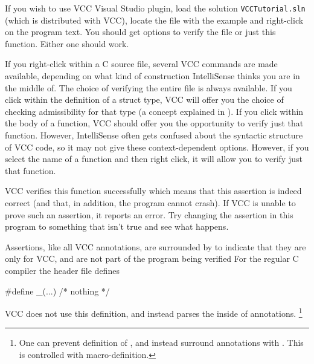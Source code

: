 If you wish to use VCC Visual Studio plugin, load the solution \lstinline|VCCTutorial.sln|
(which is distributed with VCC),
locate the file with the example and right-click on the program text.
You should get options to verify the file or just this function.
Either one should work.

\begin{note}
If you right-click within a C source file,
several VCC commands are made available, depending on what kind of
construction IntelliSense thinks you are in the middle of. The choice
of verifying the entire file is always available. If you click within
the definition of a struct type, VCC will offer you the choice of
checking admissibility for that type (a concept explained in ).
If you click within the body of a function, VCC should offer
you the opportunity to verify just that function. However,
IntelliSense often gets confused about the syntactic structure of
VCC code, so it may not give these context-dependent
options. However, if you select the name of a function and then right
click, it will allow you to verify just that function.
\end{note}

VCC verifies this function successfully which means that this assertion
is indeed correct (and that, in addition, the program cannot
crash). If VCC is unable to prove such an assertion, it reports an
error. Try changing the assertion in this program to something that
isn't true and see what happens.

Assertions, like all VCC annotations, 
are surrounded by  to indicate that they are
only for VCC, and are not part of the program being verified
For the regular C compiler the  header file defines
\begin{VCC}
#define _(...) /* nothing */
\end{VCC}
VCC does not use this definition, and instead parses the inside of 
annotations.%
\footnote{
  One can prevent definition of \vcc{_}, and instead surround annotations with
  .
  This is controlled with  macro-definition.}

